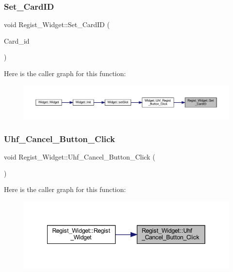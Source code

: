 \subsubsection{\texorpdfstring{Set\_CardID}{Set\_CardID}}
{\footnotesize\ttfamily void Regist\+\_\+\+Widget\+::\+Set\+\_\+\+Card\+ID (\begin{DoxyParamCaption}\item[{Q\+String}]{Card\+\_\+id }\end{DoxyParamCaption})\hspace{0.3cm}{\ttfamily [slot]}}

Here is the caller graph for this function\+:
\nopagebreak
\begin{figure}[H]
\begin{center}
\leavevmode
\includegraphics[width=350pt]{class_regist___widget_a1493d37070ac8d626fafa8239be147a7_icgraph}
\end{center}
\end{figure}
\mbox{\label{class_regist___widget_a6f3346a433ac1b4c3aa57ace03b4ac1d}} 
\subsubsection{\texorpdfstring{Uhf\_Cancel\_Button\_Click}{Uhf\_Cancel\_Button\_Click}}
{\footnotesize\ttfamily void Regist\+\_\+\+Widget\+::\+Uhf\+\_\+\+Cancel\+\_\+\+Button\+\_\+\+Click (\begin{DoxyParamCaption}{ }\end{DoxyParamCaption})\hspace{0.3cm}{\ttfamily [slot]}}

Here is the caller graph for this function\+:
\nopagebreak
\begin{figure}[H]
\begin{center}
\leavevmode
\includegraphics[width=342pt]{class_regist___widget_a6f3346a433ac1b4c3aa57ace03b4ac1d_icgraph}
\end{center}
\end{figure}
\mbox{\label{class_regist___widget_ad9bd1660e89ca91615deb86a9e8a44c3}} 
